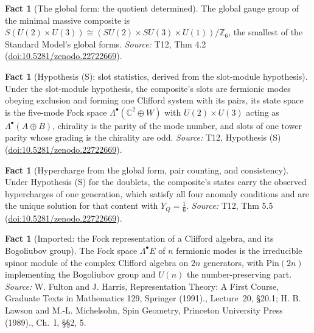 \documentclass[11pt]{article}
\theoremstyle{definition}
\newtheorem{fact}[theorem]{Fact}
\theoremstyle{plain}
\providecommand{\C}{}\renewcommand{\C}{\mathbb{C}}
\begin{document}
\begin{fact}[The global form: the quotient determined]\label{c:standard-model.global-form-quotient-determined}
The global gauge group of the minimal massive composite is $S(U(2) \times U(3)) \cong (SU(2) \times SU(3) \times U(1))/\mathbb{Z}_{6}$, the smallest of the Standard Model's global forms.
\emph{Source:} T12, Thm 4.2 (\href{https://doi.org/10.5281/zenodo.22722669}{doi:10.5281/zenodo.22722669}).
\end{fact}

\begin{fact}[Hypothesis (S): slot statistics, derived from the slot-module hypothesis]\label{c:standard-model.hyp-s-slot-statistics}
Under the slot-module hypothesis, the composite's slots are fermionic modes obeying exclusion and forming one Clifford system with its pairs, its state space is the five-mode Fock space $\Lambda^{\bullet}(\C^{2} \oplus W)$ with $U(2) \times U(3)$ acting as $\Lambda^{\bullet}(A \oplus B)$, chirality is the parity of the mode number, and slots of one tower parity whose grading is the chirality are odd.
\emph{Source:} T12, Hypothesis (S) (\href{https://doi.org/10.5281/zenodo.22722669}{doi:10.5281/zenodo.22722669}).
\end{fact}

\begin{fact}[Hypercharge from the global form, pair counting, and consistency]\label{c:standard-model.hypercharge-global-form-pair-counting-consistency}
Under Hypothesis (S) for the doublets, the composite's states carry the observed hypercharges of one generation, which satisfy all four anomaly conditions and are the unique solution for that content with $Y_{Q} = \tfrac16$.
\emph{Source:} T12, Thm 5.5 (\href{https://doi.org/10.5281/zenodo.22722669}{doi:10.5281/zenodo.22722669}).
\end{fact}

\begin{fact}[Imported: the Fock representation of a Clifford algebra, and its Bogoliubov group]\label{c:standard-model.imported-fock-representation-clifford-algebra-bogoliubov}
The Fock space $\Lambda^{\bullet}E$ of $n$ fermionic modes is the irreducible spinor module of the complex Clifford algebra on $2n$ generators, with $\mathrm{Pin}(2n)$ implementing the Bogoliubov group and $U(n)$ the number-preserving part.
\emph{Source:} W. Fulton and J. Harris, Representation Theory: A First Course, Graduate Texts in Mathematics 129, Springer (1991)., Lecture~20, \S 20.1; H. B. Lawson and M.-L. Michelsohn, Spin Geometry, Princeton University Press (1989)., Ch.~I, \S\S 2, 5.
\end{fact}
\end{document}
